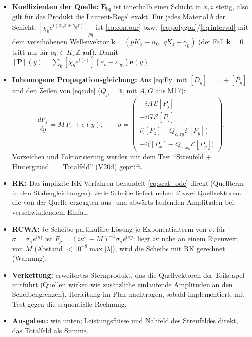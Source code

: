 \begin{itemize}[nosep]
  \item \textbf{Koeffizienten der Quelle:} $\mathbf E_{\text{bg}}$ ist innerhalb einer Schicht in $x,z$ stetig, also gilt für das
        Produkt die Laurent-Regel exakt. Für jedes Material $b$ der Schicht:
        $[\chi_be^{i(\alpha_0x+\gamma_0z)}]_{pq}$ ist \eqref{eq:contour} bzw.\ \eqref{eq:polygon}/\eqref{eq:interval} mit dem
        verschobenen Wellenvektor $\mathbf k=(pK_x-\alpha_0,\ qK_z-\gamma_0)$ (der Fall $\mathbf k=0$ tritt nur für
        $\alpha_0\in K_x\mathbb Z$ auf). Damit $[\mathbf P](y)=\sum_b[\chi_be^{i(\cdot)}](\varepsilon_b-\varepsilon_{\text{bg}})\mathbf e(y)$.
  \item \textbf{Inhomogene Propagationsgleichung:} Aus \eqref{eq:Ey} mit $[D_y]=\dots+[P_y]$ und den Zeilen von \eqref{eq:ode}
        ($Q_\mu=\mathbb 1$, mit $A,G$ aus M17):
        \begin{equation}
          \frac{dF_s}{dy}=M\,F_s+\sigma(y),\qquad
          \sigma=\begin{pmatrix}-iA\,\mathcal E[P_y]\\ -iG\,\mathcal E[P_y]\\ i\big([P_z]-Q_{\varepsilon,zy}\mathcal E[P_y]\big)\\
          -i\big([P_x]-Q_{\varepsilon,xy}\mathcal E[P_y]\big)\end{pmatrix}.
          \label{eq:scat_ode}
        \end{equation}
        Vorzeichen und Faktorisierung werden mit dem Test \enquote{Streufeld + Hintergrund $=$ Totalfeld} (V20d) geprüft.
  \item \textbf{RK:} Das implizite RK-Verfahren behandelt \eqref{eq:scat_ode} direkt (Quellterm in den Stufengleichungen).
        Jede Scheibe liefert neben $S$ zwei Quellvektoren: die von der Quelle erzeugten aus- und abwärts laufenden
        Amplituden bei verschwindendem Einfall.
  \item \textbf{RCWA:} Je Scheibe partikuläre Lösung je Exponentialterm von $\sigma$: für $\sigma=\sigma_\kappa e^{i\kappa y}$ ist
        $F_p=(i\kappa\mathbb 1-M)^{-1}\sigma_\kappa e^{i\kappa y}$; liegt $i\kappa$ nahe an einem Eigenwert von $M$
        (Abstand $<10^{-8}\max|\lambda|$), wird die Scheibe mit RK gerechnet (Warnung).
  \item \textbf{Verkettung:} erweitertes Sternprodukt, das die Quellvektoren der Teilstapel mitführt (Quellen wirken wie
        zusätzliche einlaufende Amplituden an den Scheibengrenzen). Herleitung im Plan nachtragen, sobald implementiert,
        mit Test gegen die sequentielle Rechnung.
  \item \textbf{Ausgaben:} wie unten; Leistungsflüsse und Nahfeld des Streufeldes direkt, das Totalfeld als Summe.
\end{itemize}

